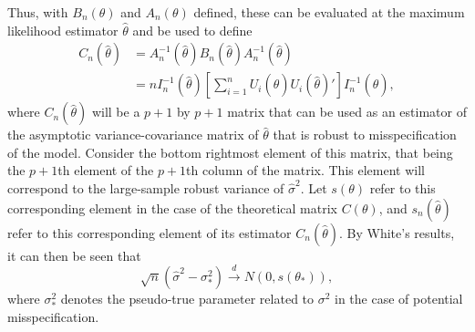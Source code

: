 		Thus, with $B_n(\theta)$ and $A_n(\theta)$ defined, these can be evaluated at the maximum likelihood estimator $\hat{\theta}$ and be used to define
		\begin{equation}
			\begin{split}
				C_n(\hat{\theta}) & = A^{-1}_n(\hat{\theta}) B_n(\hat{\theta}) A^{-1}_n(\hat{\theta}) \\
				& = n I_n^{-1}(\hat{\theta}) [\sum_{i=1}^{n} U_i(\hat{\theta}) U_i(\hat{\theta})'] I_n^{-1}(\hat{\theta}) ,
			\end{split}
		\end{equation}
		where $C_n(\hat{\theta})$ will be a $p+1$ by $p+1$ matrix that can be used as an estimator of the asymptotic variance-covariance matrix of $\hat{\theta}$ that is robust to misspecification
		of the model. Consider the bottom rightmost element of this matrix, that being the $p+1$th element of the $p+1$th column of the matrix. This element will correspond to the large-sample
		robust variance of $\hat{\sigma}^2$. Let $s(\theta)$ refer to this corresponding element in the case of the theoretical matrix $C(\theta)$, and $s_n(\hat{\theta})$ refer to this
		corresponding element of its estimator $C_n(\hat{\theta})$. By White's results, it can then be seen that
		\begin{equation}
			\sqrt{n} (\hat{\sigma}^2 - \sigma_*^2) \xrightarrow[]{d} N(0, s(\theta_*)) ,
		\end{equation}
		where $\sigma_*^2$ denotes the pseudo-true parameter related to $\sigma^2$ in the case of potential misspecification.

